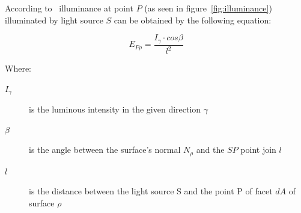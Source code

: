According to~\cite{Habel} illuminance at point $P$ (as seen in figure~\ref{fig:illuminance}) illuminated by light source $S$ can be obtained by the following equation:

\begin{equation}
E_{P\rho}=\frac{I_{\gamma} \cdot cos \beta}{l^2}
\end{equation}

Where:
\begin{description}
	\item[$I_{\gamma}$] is the luminous intensity in the given direction $\gamma$
	\item[$\beta$] is the angle between the surface's normal $N_{\rho}$ and the $SP$ point join $l$
	\item[$l$] is the distance between the light source S and the point P of facet $dA$ of surface $\rho$
\end{description}

